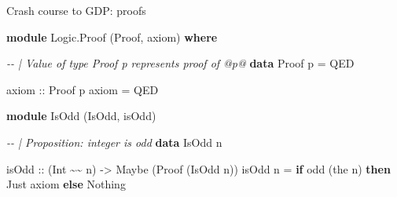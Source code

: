 \documentclass[
  9pt,
  ignorenonframetext,
]{beamer}
\newenvironment{Shaded}{}{}
\newcommand{\CommentTok}[1]{\textcolor[rgb]{0.38,0.63,0.69}{\textit{#1}}}
\newcommand{\DataTypeTok}[1]{\textcolor[rgb]{0.56,0.13,0.00}{#1}}
\newcommand{\FunctionTok}[1]{\textcolor[rgb]{0.02,0.16,0.49}{#1}}
\newcommand{\KeywordTok}[1]{\textcolor[rgb]{0.00,0.44,0.13}{\textbf{#1}}}
\newcommand{\NormalTok}[1]{#1}
\newcommand{\OperatorTok}[1]{\textcolor[rgb]{0.40,0.40,0.40}{#1}}
\newcommand{\OtherTok}[1]{\textcolor[rgb]{0.00,0.44,0.13}{#1}}
\begin{document}
\begin{frame}[fragile]{Crash course to GDP: proofs}
\protect\hypertarget{crash-course-to-gdp-proofs}{}
\begin{Shaded}
\begin{Highlighting}[]
\KeywordTok{module} \DataTypeTok{Logic.Proof}\NormalTok{ (}\DataTypeTok{Proof}\NormalTok{, axiom) }\KeywordTok{where}

\CommentTok{{-}{-} | Value of type \textquotesingle{}Proof p\textquotesingle{} represents proof of @p@}
\KeywordTok{data} \DataTypeTok{Proof}\NormalTok{ p }\OtherTok{=} \DataTypeTok{QED}

\OtherTok{axiom ::} \DataTypeTok{Proof}\NormalTok{ p }
\NormalTok{axiom }\OtherTok{=} \DataTypeTok{QED}

\KeywordTok{module} \DataTypeTok{IsOdd}\NormalTok{ (}\DataTypeTok{IsOdd}\NormalTok{, isOdd)}

\CommentTok{{-}{-} | Proposition: integer is odd}
\KeywordTok{data} \DataTypeTok{IsOdd}\NormalTok{ n}

\OtherTok{isOdd ::}\NormalTok{ (}\DataTypeTok{Int} \OperatorTok{\textasciitilde{}\textasciitilde{}}\NormalTok{ n) }\OtherTok{{-}\textgreater{}} \DataTypeTok{Maybe}\NormalTok{ (}\DataTypeTok{Proof}\NormalTok{ (}\DataTypeTok{IsOdd}\NormalTok{ n))}
\NormalTok{isOdd n }\OtherTok{=} \KeywordTok{if} \FunctionTok{odd}\NormalTok{ (the n) }
  \KeywordTok{then} \DataTypeTok{Just}\NormalTok{ axiom}
  \KeywordTok{else} \DataTypeTok{Nothing}
\end{Highlighting}
\end{Shaded}





\end{frame}
\end{document}
